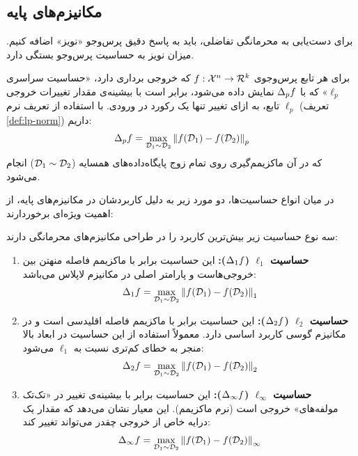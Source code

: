 \subsection{مکانیزم‌های پایه}
\label{sec:bg:cdp-mechanisms}

برای دست‌یابی به محرمانگی تفاضلی، باید به پاسخ دقیق پرس‌وجو «نویز» اضافه کنیم. میزان نویز به حساسیت پرس‌وجو بستگی دارد.

\begin{تعریف}
\label{def:sensitivity-lp}
برای هر تابع پرس‌وجوی $f: \Xset^n \to \Rset^k$ که خروجی برداری دارد، «حساسیت سراسری $\ell_p$» که با $\Delta_p f$ نمایش داده می‌شود، برابر است با بیشینه‌ی مقدار تغییرات خروجی تابع، به ازای تغییر تنها یک رکورد در ورودی.
با استفاده از تعریف نرم $\ell_p$ (تعریف \ref{def:lp-norm}) داریم:
\begin{equation}
\Del_p f = \max_{\Dset[1] \sim \Dset[2]} \left\| f(\Dset[1]) - f(\Dset[2]) \right\|_p
\end{equation}
که در آن ماکزیمم‌گیری روی تمام زوج پایگاه‌داده‌های همسایه ($\Dset[1] \sim \Dset[2]$) انجام می‌شود.
\end{تعریف}

در میان انواع حساسیت‌ها، دو مورد زیر به دلیل کاربردشان در مکانیزم‌های پایه، از اهمیت ویژه‌ای برخوردارند:

\begin{تعریف}
\label{def:sensitivity-specific}
سه نوع حساسیت زیر بیش‌ترین کاربرد را در طراحی مکانیزم‌های محرمانگی دارند:

\begin{enumerate}
    \item \textbf{حساسیت $\ell_1$ ($\Delta_1 f$):}
    این حساسیت برابر با ماکزیمم فاصله منهتن بین خروجی‌هاست و پارامتر اصلی در مکانیزم لاپلاس می‌باشد:
    \begin{equation}
    \Del_1 f = \max_{\Dset[1] \sim \Dset[2]} \left\| f(\Dset[1]) - f(\Dset[2]) \right\|_1
    \end{equation}
    
    \item \textbf{حساسیت $\ell_2$ ($\Delta_2 f$):}
    این حساسیت برابر با ماکزیمم فاصله اقلیدسی است و در مکانیزم گوسی کاربرد اساسی دارد. معمولاً استفاده از این حساسیت در ابعاد بالا منجر به خطای کم‌تری نسبت به $\ell_1$ می‌شود:
    \begin{equation}
    \Del_2 f = \max_{\Dset[1] \sim \Dset[2]} \left\| f(\Dset[1]) - f(\Dset[2]) \right\|_2
    \end{equation}

    \item \textbf{حساسیت $\ell_\infty$ ($\Delta_\infty f$):}
    این حساسیت برابر با بیشینه‌ی تغییر در «تک‌تک مولفه‌های» خروجی است (نرم ماکزیمم). این معیار نشان می‌دهد که مقدار یک درایه خاص از خروجی چقدر می‌تواند تغییر کند:
    \begin{equation}
    \Del_\infty f = \max_{\Dset[1] \sim \Dset[2]} \left\| f(\Dset[1]) - f(\Dset[2]) \right\|_\infty
    \end{equation}
\end{enumerate}
\end{تعریف}


